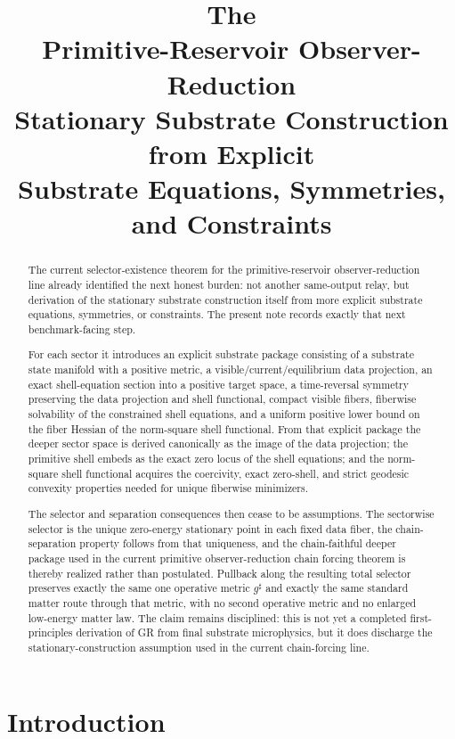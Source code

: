 \documentclass[11pt]{article}
\title{\textbf{The \TheoryName{}}\\[0.4em]
\large Primitive-Reservoir Observer-Reduction\\
\large Stationary Substrate Construction from Explicit\\
\large Substrate Equations, Symmetries, and Constraints}
\author{}
\date{}
\newcommand{\CompletedMetric}{g^{\sharp}}
\begin{document}
\maketitle

\begin{abstract}
The current selector-existence theorem for the primitive-reservoir observer-reduction line already identified the next honest burden: not another same-output relay, but derivation of the stationary substrate construction itself from more explicit substrate equations, symmetries, or constraints. The present note records exactly that next benchmark-facing step.

For each sector it introduces an explicit substrate package consisting of a substrate state manifold with a positive metric, a visible/current/equilibrium data projection, an exact shell-equation section into a positive target space, a time-reversal symmetry preserving the data projection and shell functional, compact visible fibers, fiberwise solvability of the constrained shell equations, and a uniform positive lower bound on the fiber Hessian of the norm-square shell functional. From that explicit package the deeper sector space is derived canonically as the image of the data projection; the primitive shell embeds as the exact zero locus of the shell equations; and the norm-square shell functional acquires the coercivity, exact zero-shell, and strict geodesic convexity properties needed for unique fiberwise minimizers.

The selector and separation consequences then cease to be assumptions. The sectorwise selector is the unique zero-energy stationary point in each fixed data fiber, the chain-separation property follows from that uniqueness, and the chain-faithful deeper package used in the current primitive observer-reduction chain forcing theorem is thereby realized rather than postulated. Pullback along the resulting total selector preserves exactly the same one operative metric \(\CompletedMetric\) and exactly the same standard matter route through that metric, with no second operative metric and no enlarged low-energy matter law. The claim remains disciplined: this is not yet a completed first-principles derivation of GR from final substrate microphysics, but it does discharge the stationary-construction assumption used in the current chain-forcing line.
\end{abstract}

\section{Introduction}
\end{document}
